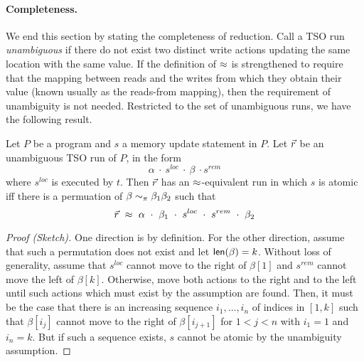 \paragraph{Completeness.}
We end this section by stating the completeness of reduction.
Call a TSO run {\em unambiguous} if there do not exist two distinct write actions updating the same location with the same value.
If the definition of $\approx$ is strengthened to require that the mapping between reads and the writes from which they obtain their value (known usually as the reads-from mapping), then the requirement of unambiguity is not needed.
Restricted to the set of unambiguous runs, we have the following result.
\begin{theorem}
Let $P$ be a program and $s$ a memory update statement in $P$.
Let $\vec{r}$ be an unambiguous TSO run of $P$, in the form 
\[
\alpha\ \cdot\ s^{loc}\ \cdot\ \beta\ \cdot s^{rem}
\]
where $s^{loc}$ is executed by $t$.
Then $\vec{r}$ has an $\approx$-equivalent run in which $s$ is atomic iff there is a permuation of $\beta\sim_{\pi}\beta_1\beta_2$ such that 
\[
\alisequencex r\ \tsoequiv\ \alpha\ \cdot\ \beta_1\ \cdot\ s^{loc}\ \cdot\ s^{rem}\ \cdot\ \beta_2 
\]
\end{theorem}
\begin{proof}[Proof (Sketch)]
One direction is by definition.
For the other direction, assume that such a permutation does not exist and let $\mathsf{len}(\beta)=k$.
Without loss of generality, assume that $s^{loc}$ cannot move to the right of $\beta[1]$ and $s^{rem}$ cannot move the left of $\beta[k]$.
Otherwise, move both actions to the right and to the left until such actions which must exist by the assumption are found.
Then, it must be the case that there is an increasing sequence $i_1,\ldots,i_n$ of indices in $[1,k]$ such that $\beta[i_j]$ cannot move to the right of $\beta[i_{j+1}]$ for $1<j<n$ with $i_1=1$ and $i_n=k$.
But if such a sequence exists, $s$ cannot be atomic by the unambiguity assumption.
\end{proof}

%
